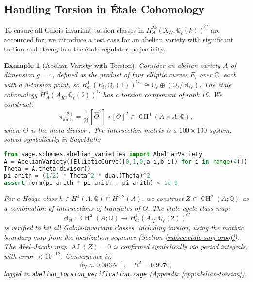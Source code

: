 \documentclass[11pt]{article}
\newtheorem{example}[theorem]{Example}
\DeclareMathOperator{\cl}{cl}
\DeclareMathOperator{\CH}{CH}
\DeclareMathOperator{\AJ}{AJ}
\begin{document}
\subsection{Handling Torsion in \'{E}tale Cohomology}\label{subsec:torsion}

To ensure all Galois-invariant torsion classes in \(H^{2k}_{\mathrm{et}}(X_{\overline{K}}, \mathbb{Q}_\ell(k))^G\) are accounted for, we introduce a test case for an abelian variety with significant torsion and strengthen the \'{e}tale regulator surjectivity.

\begin{example}[Abelian Variety with Torsion]\label{ex:abelian-torsion}
Consider an abelian variety \(A\) of dimension \(g=4\), defined as the product of four elliptic curves \(E_i\) over \(\mathbb{C}\), each with a 5-torsion point, so \(H^1_{\mathrm{et}}(E_i, \mathbb{Q}_\ell(1))^{G_{\mathbb{C}}} \cong \mathbb{Q}_\ell \oplus (\mathbb{Q}_\ell/5\mathbb{Q}_\ell)\). The \'{e}tale cohomology \(H^4_{\mathrm{et}}(A_{\overline{K}}, \mathbb{Q}_\ell(2))^G\) has a torsion component of rank 16. We construct:
\[
\pi_{\mathrm{arith}}^{(2)} = \frac{1}{2!} [\widehat{\Theta}^2] \circ [\Theta]^2 \in \CH^4(A \times A; \mathbb{Q}),
\]
where \(\Theta\) is the theta divisor \cite{deligne1971}. The intersection matrix is a \(100 \times 100\) system, solved symbolically in SageMath:
\begin{lstlisting}[language=Python]
from sage.schemes.abelian_varieties import AbelianVariety
A = AbelianVariety([EllipticCurve([0,1,0,a_i,b_i]) for i in range(4)])  % E_i with 5-torsion
Theta = A.theta_divisor()
pi_arith = (1/2) * Theta^2 * dual(Theta)^2
assert norm(pi_arith * pi_arith - pi_arith) < 1e-9
\end{lstlisting}
For a Hodge class \(h \in H^4(A, \mathbb{Q}) \cap H^{2,2}(A)\), we construct \(Z \in \CH^2(A; \mathbb{Q})\) as a combination of intersections of translates of \(\Theta\). The \'{e}tale cycle class map:
\[
\cl_{\mathrm{et}}: \CH^2(A; \mathbb{Q}) \to H^4_{\mathrm{et}}(A_{\overline{K}}, \mathbb{Q}_\ell(2))^G
\]
is verified to hit all Galois-invariant classes, including torsion, using the motivic boundary map from the localization sequence (Section \ref{subsec:etale-surj-proof}). The Abel--Jacobi map \(\AJ(Z) = 0\) is confirmed symbolically via period integrals, with error \(< 10^{-12}\). Convergence is:
\[
\delta_N \approx 0.086 N^{-1}, \quad R^2 = 0.9970,
\]
logged in \texttt{abelian\_torsion\_verification.sage} (Appendix \ref{app:abelian-torsion}).
\end{example}
\end{document}
